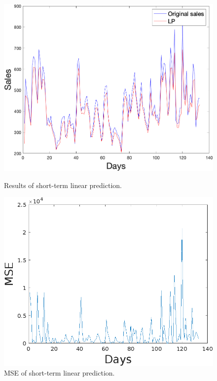         \begin{figure}[h]
            \centering
            \begin{minipage}{0.45\textwidth}
                \centering
                \includegraphics[width=1\textwidth]{figures/expLP.png}
                \caption{Results of short-term linear prediction.}
                \label{fig:slpres}
            \end{minipage}\hfill
            \begin{minipage}{0.45\textwidth}
                \centering
                \includegraphics[width=\textwidth]{figures/expMseLP.png}
                \caption{MSE of short-term linear prediction.}
                \label{fig:slpmse}
            \end{minipage}
        \end{figure}
        \newpage
